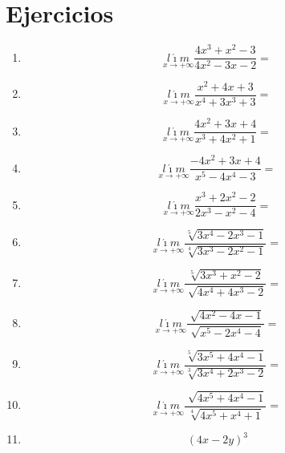 \documentclass[oneside,spanish,letter]{article}
\begin{document}
\section{Ejercicios}
\begin{enumerate}
 \item $$\underset{x\rightarrow +\infty}{l\acute{\imath}m} \frac{4x^3+x^2-3}{4x^2-3x-2}=$$
 \item $$\underset{x\rightarrow +\infty}{l\acute{\imath}m} \frac{x^2+4x+3}{x^4+3x^3+3}=$$
 \item $$\underset{x\rightarrow +\infty}{l\acute{\imath}m} \frac{4x^2+3x+4}{x^3+4x^2+1}=$$
 \item $$\underset{x\rightarrow +\infty}{l\acute{\imath}m} \frac{-4x^2+3x+4}{x^5-4x^4-3}=$$
 \item $$\underset{x\rightarrow +\infty}{l\acute{\imath}m} \frac{x^3+2x^2-2}{2x^3-x^2-4}=$$
 \item $$\underset{x\rightarrow +\infty}{l\acute{\imath}m} \frac{\sqrt[5]{3x^4-2x^3-1}}{\sqrt[4]{3x^3-2x^2-1}}=$$
 \item $$\underset{x\rightarrow +\infty}{l\acute{\imath}m} \frac{\sqrt[5]{3x^3+x^2-2}}{\sqrt[]{4x^4+4x^3-2}}=$$
 \item $$\underset{x\rightarrow +\infty}{l\acute{\imath}m} \frac{\sqrt[]{4x^2-4x-1}}{\sqrt[]{x^5-2x^4-4}}=$$
 \item $$\underset{x\rightarrow +\infty}{l\acute{\imath}m} \frac{\sqrt[5]{3x^5+4x^4-1}}{\sqrt[3]{3x^4+2x^3-2}}=$$
 \item $$\underset{x\rightarrow +\infty}{l\acute{\imath}m} \frac{\sqrt[]{4x^5+4x^4-1}}{\sqrt[4]{4x^5+x^4+1}}=$$
\item $$(4x-2y)^3$$
 \end{enumerate}
  \newpage
\end{document}
